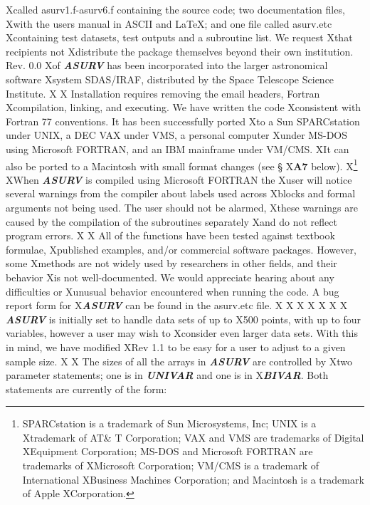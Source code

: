 Xcalled asurv1.f-asurv6.f containing the source code; two documentation files,
Xwith the users manual in ASCII and LaTeX; and one file called asurv.etc
Xcontaining test datasets, test outputs and a subroutine list. We request 
Xthat  recipients not 
Xdistribute the package themselves beyond their own institution.  Rev. 0.0
Xof {\sl\bf ASURV} has been incorporated into the larger astronomical software 
Xsystem SDAS/IRAF, distributed by the Space Telescope Science Institute. 
X 
X     Installation requires removing the email headers, Fortran 
Xcompilation, linking, and executing.  We have written the code
Xconsistent with Fortran 77 conventions.  It has been successfully ported
Xto a Sun SPARCstation under UNIX, a DEC VAX under VMS, a personal computer
Xunder MS-DOS using Microsoft FORTRAN, and an IBM mainframe under VM/CMS.
XIt can also be ported to a Macintosh with small format changes (see \S
X{\bf A7} below).  
X\footnote{SPARCstation is a trademark of Sun Microsystems, Inc; UNIX is a 
Xtrademark of AT\& T Corporation; VAX and VMS are trademarks of Digital 
XEquipment Corporation; MS-DOS and Microsoft FORTRAN are trademarks of
XMicrosoft Corporation; VM/CMS is a trademark of International
XBusiness Machines Corporation; and Macintosh is a trademark of Apple
XCorporation.}
XWhen {\sl\bf ASURV} is compiled using Microsoft FORTRAN the
Xuser will notice several warnings from the compiler about labels used across
Xblocks and formal arguments not being used.  The user should not be alarmed,
Xthese warnings are caused by the compilation of the subroutines separately
Xand do not reflect program errors.
X
X     All of the functions have been tested against textbook formulae, 
Xpublished examples, and/or commercial software  packages.  However, some 
Xmethods are not widely used by researchers in other fields, and their behavior
Xis not well-documented.  We would appreciate hearing about any difficulties or
Xunusual behavior encountered when running the code. A bug report form for
X{\sl\bf ASURV} can be found in the asurv.etc file. 
X
X\bigskip
X\bigskip
X
X
X
X       {\sl\bf ASURV} is initially set to handle data sets of up to 
X500 points, with up to  four variables, however a user may wish to 
Xconsider even larger data sets.  With this in mind, we have modified 
XRev 1.1 to be easy for a user to adjust to a given sample size.
X
X       The sizes of all the arrays in {\sl\bf ASURV} are controlled by 
Xtwo parameter statements; one is in {\sl\bf UNIVAR} and one is in 
X{\sl\bf BIVAR}.  Both statements are currently of the form:
